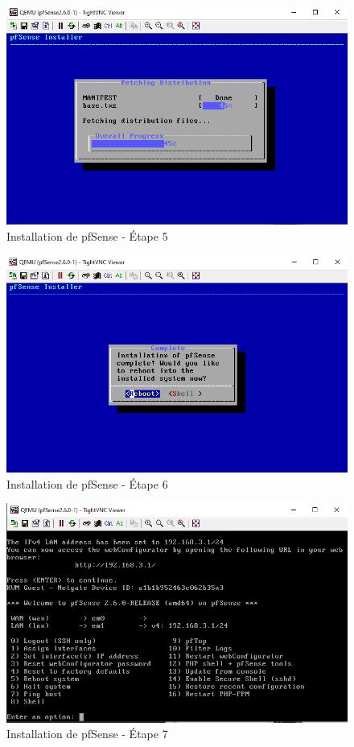 \begin{figure}[H]
\centering
\includegraphics[width=15cm]{Images/BRadesMelian-Topologie6.png}
\caption{Installation de pfSense - Étape 5}
\label{Chap3.3.6}
\end{figure}

\begin{figure}[H]
\centering
\includegraphics[width=15cm]{Images/BRadesMelian-Topologie7.png}
\caption{Installation de pfSense - Étape 6}
\label{Chap3.3.7}
\end{figure}

\begin{figure}[H]
\centering
\includegraphics[width=15cm]{Images/BRadesMelian-Topologie8.png}
\caption{Installation de pfSense - Étape 7}
\label{Chap3.3.8}
\end{figure}

